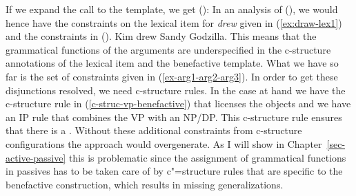 If we expand the call to the  template, we get ():
\ea
{}
\z
In an analysis of (), we would hence have the constraints on the lexical item for \emph{drew}
given in (\ref{ex:draw-lex1}) and the constraints in ().
\ea
Kim drew Sandy Godzilla.
\z
This means that the grammatical functions of the arguments are underspecified in the c-structure annotations of the lexical item and
the benefactive template. What we have so far is the set of constraints given in
(\ref{ex-arg1-arg2-arg3}). In order to get these disjunctions
resolved\label{page-disjunctions-gf-c-structure}, 
we need c-structure rules. In the case at hand we have the c-structure rule in (\ref{c-struc-vp-benefactive}) that
licenses the objects and we have an IP rule that combines the VP with an NP/DP. This c-structure
rule ensures that there is a \subj. Without these additional constraints from c-structure
configurations the approach would overgenerate. As I will show in Chapter~\ref{sec-active-passive} this is
problematic since the assignment of grammatical functions in passives has to be taken care of by
c"=structure rules that are specific to the benefactive construction, which results in missing
generalizations.

